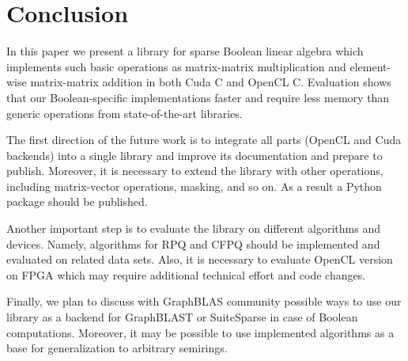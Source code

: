 \section{Conclusion}

In this paper we present a library for sparse Boolean linear algebra which implements such basic operations as matrix-matrix multiplication and element-wise matrix-matrix addition in both Cuda C and OpenCL C.
Evaluation shows that our Boolean-specific implementations faster and require less memory than generic operations from state-of-the-art libraries.

The first direction of the future work is to integrate all parts (OpenCL and Cuda backends) into a single library and improve its documentation and prepare to publish.
Moreover, it is necessary to extend the library with other operations, including matrix-vector operations, masking, and so on.
As a result a Python package should be published.

Another important step is to evaluate the library on different algorithms and devices.
Namely, algorithms for RPQ and CFPQ should be implemented and evaluated on related data sets.
Also, it is necessary to evaluate OpenCL version on FPGA which may require additional technical effort and code changes.

Finally, we plan to discuss with GraphBLAS community possible ways to use our library as a backend for GraphBLAST or SuiteSparse in case of Boolean computations.
Moreover, it may be possible to use implemented algorithms as a base for generalization to arbitrary semirings.
